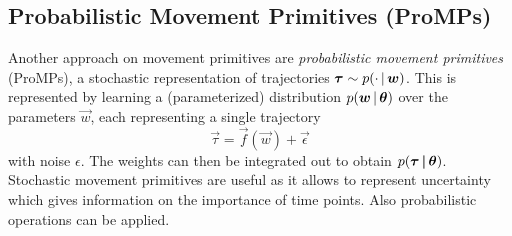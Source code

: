 		\subsection{Probabilistic Movement Primitives (ProMPs)}
			Another approach on movement primitives are \emph{probabilistic movement primitives} (ProMPs), a stochastic representation of trajectories \( \bm{\tau} \sim p(\cdot \,\vert\, \bm{w}) \). This is represented by learning a (parameterized) distribution \( p(\bm{w} \,\vert\, \bm{\theta}) \) over the parameters \(\vec{w}\), each representing a single trajectory
			\begin{equation*}
				\vec{\tau} = \vec{f}(\vec{w}) + \vec{\epsilon}
			\end{equation*}
			with noise \(\epsilon\). The weights can then be integrated out to obtain \( p(\bm{\tau \,\vert\, \bm{\theta}}) \). Stochastic movement primitives are useful as it allows to represent uncertainty which gives information on the importance of time points. Also probabilistic operations can be applied.

